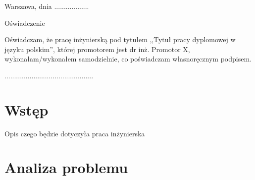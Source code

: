 \documentclass[a4paper,11pt,twoside]{report}
\theoremstyle{definition}
\newcommand{\tytul}{Tytuł pracy dyplomowej w języku polskim}
\newcommand{\type}{inżyniers} %
\newcommand{\supervisor}{dr inż. Promotor X}
\begin{document}


\null\thispagestyle{empty}\newpage

\null \hfill Warszawa, dnia ..................\\

\par\vspace{5cm}

\begin{center}
Oświadczenie
\end{center}

\indent Oświadczam, że pracę \type ką pod
tytułem ,,\tytul '', której promotorem jest \supervisor , wykonałam/wykonałem
samodzielnie, co poświadczam własnoręcznym podpisem.
\vspace{2cm}


\begin{flushright}
  \begin{minipage}{50mm}
    \begin{center}
      ..............................................

    \end{center}
  \end{minipage}
\end{flushright}

\thispagestyle{empty}
\newpage

\null\thispagestyle{empty}\newpage


\tableofcontents
\thispagestyle{empty}

\newpage %

\null\thispagestyle{empty}\newpage
\pagestyle{fancy}
\setcounter{page}{11} %

\chapter{Wstęp}
    Opis czego będzie dotyczyła praca inżynierska

\chapter{Analiza problemu}
\end{document}
